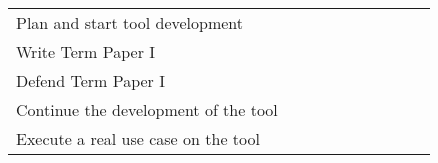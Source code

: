 \begin{table}[!htb]
\begin{tabular}{p{4cm}|l|lllll|lll}
    Plan and start tool development                                                                                                   &                                      &                                      & {\cellcolor[rgb]{0.753,0.753,0.753}} & {\cellcolor[rgb]{0.753,0.753,0.753}} &                                      &                                      &                                      &                                      &                                      \\
    \rowcolor[rgb]{0.914,0.914,0.914} Write Term Paper I                                                                              &                                      &                                      &                                      & {\cellcolor[rgb]{0.753,0.753,0.753}} & {\cellcolor[rgb]{0.753,0.753,0.753}} & {\cellcolor[rgb]{0.753,0.753,0.753}} &                                      &                                      &                                      \\
    Defend Term Paper I                                                                                                               &                                      &                                      &                                      &                                      &                                      & {\cellcolor[rgb]{0.753,0.753,0.753}} &                                      &                                      &                                      \\
    \rowcolor[rgb]{0.914,0.914,0.914} Continue the development of the tool                                                            &                                      &                                      &                                      &                                      &                                      & {\cellcolor[rgb]{0.753,0.753,0.753}} & {\cellcolor[rgb]{0.753,0.753,0.753}} & {\cellcolor[rgb]{0.753,0.753,0.753}} &                                      \\
    Execute a real use case on the tool                                                                                               &                                      &                                      &                                      &                                      &                                      &                                      &                                      & {\cellcolor[rgb]{0.753,0.753,0.753}} &                                      \\

\end{tabular}
\end{table}

